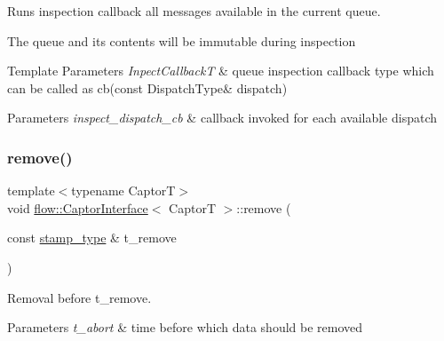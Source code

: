 Runs inspection callback all messages available in the current queue. 

The queue and its contents will be immutable during inspection


\begin{DoxyTemplParams}{Template Parameters}
{\em Inpect\+CallbackT} & queue inspection callback type which can be called as {\ttfamily cb(const Dispatch\+Type\& dispatch)}\\
\hline
\end{DoxyTemplParams}

\begin{DoxyParams}{Parameters}
{\em inspect\+\_\+dispatch\+\_\+cb} & callback invoked for each available dispatch \\
\hline
\end{DoxyParams}
\mbox{\label{classflow_1_1_captor_interface_a492c00041af4fe2cb92342482b0b59fe}} 
\subsubsection{\texorpdfstring{remove()}{remove()}}
{\footnotesize\ttfamily template$<$typename CaptorT$>$ \\
void \hyperlink{classflow_1_1_captor_interface}{flow\+::\+Captor\+Interface}$<$ CaptorT $>$\+::remove (\begin{DoxyParamCaption}\item[{const \hyperlink{classflow_1_1_captor_interface_a2b87d20d17e8d1437941bd98fe514bc8}{stamp\+\_\+type} \&}]{t\+\_\+remove }\end{DoxyParamCaption})\hspace{0.3cm}{\ttfamily [inline]}}



Removal before {\ttfamily t\+\_\+remove}. 


\begin{DoxyParams}{Parameters}
{\em t\+\_\+abort} & time before which data should be removed \\
\hline
\end{DoxyParams}
\mbox{\label{classflow_1_1_captor_interface_a8068310b1ece5c53a11252919a62355a}} 
